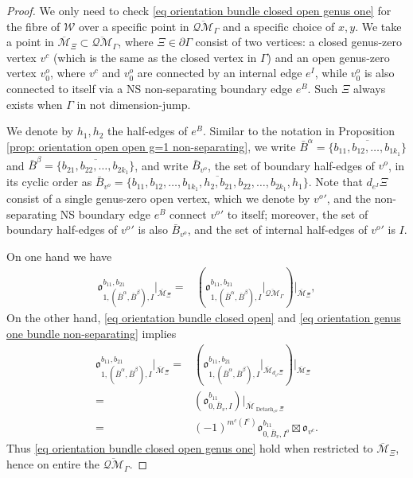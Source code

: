 \documentclass[11pt,a4paper]{article}
\theoremstyle{definition}
\theoremstyle{remark}
\newcommand{\oQMb}{{\overline{\mathcal{QM}}}}
\numberwithin{equation}{section}
\def\Mbar{{\overline{\mathcal M}}}
\begin{document}
\begin{proof}
    We only need to check \eqref{eq orientation bundle closed open genus one} for the fibre of $\mathcal W$ over a specific point in $\oQMb_\Gamma$ and a specific choice of $x,y$. We take a point in     $\Mbar_{\Xi}\subset \oQMb_{\Gamma}$,     where $\Xi\in \partial \Gamma$ consist of two vertices: a closed genus-zero vertex $v^c$ (which is the same as the closed vertex in $\Gamma$) and an open genus-zero vertex $v^o_0$, where $v^c$ and $v^o_0$ are connected by an internal edge $e^I$, while $v^o_0$ is also connected to itself via a NS non-separating  boundary edge $e^B$. Such $\Xi$ always exists when $\Gamma$ in not dimension-jump.

    We denote by $h_1,h_2$ the half-edges of $e^B$. Similar to the notation in Proposition \ref{prop: orientation open open g=1 non-separating}, we write $\bar{B}^\alpha=\overline{\{b_{11},b_{12},\dots,b_{1k_1}\}}$ and $\bar{B}^\beta=\overline{\{b_{21},b_{22},\dots,b_{2k_1}\}}$, and write $\bar{B}_{v^o}$, the set of boundary half-edges of $v^o$, in its cyclic order as $\bar{B}_{v^o}=\overline{\{b_{11},b_{12},\dots,b_{1k_1},h_2,b_{21},b_{22},\dots,b_{2k_1},h_1\}}$. Note that $d_{e^I}\Xi$ consist of a single genus-zero open vertex, which we denote by ${v^o}'$, and the non-separating NS boundary edge $e^B$ connect ${v^o}'$ to itself; moreover, the set of boundary half-edges of ${v^o}'$ is also $\bar{B}_{v^o}$, and the set of internal half-edges of ${v^o}'$ is $I$.
    

    
    On one hand we have
    \begin{equation*}
    \begin{split}
        {\mathfrak{o}}^{b_{11},b_{21}}_{1,(\bar{B}^\alpha,\bar{B}^\beta),I}|_{\Mbar_\Xi} =&\left({\mathfrak{o}}^{b_{11},b_{21}}_{1,(\bar{B}^\alpha,\bar{B}^\beta),I}|_{\oQMb_\Gamma}\right)\big\vert_{\Mbar_{\Xi}},
    \end{split}
    \end{equation*}
   On the other hand, \eqref{eq orientation bundle closed open} and \eqref{eq orientation genus one bundle non-separating} implies 
    \begin{equation*}
    \begin{split}
        {\mathfrak{o}}^{b_{11},b_{21}}_{1,(\bar{B}^\alpha,\bar{B}^\beta),I}|_{\Mbar_\Xi} =&\left({\mathfrak{o}}^{b_{11},b_{21}}_{1,(\bar{B}^\alpha,\bar{B}^\beta),I}|_{\Mbar_{d_{e^I}\Xi}}\right)\big\vert_{\Mbar_{\Xi}}\\
        =&  \left( {\mathfrak{o}}^{b_{11}}_{0,\bar B_v,I} \right)\big \vert_{\Mbar_{\operatorname{Detach}_{e^B} \Xi}}
        \\=&(-1)^{m^c(I^c)}{\mathfrak{o}}^{b_{11}}_{0,\bar{B}_v,I^o}\boxtimes {\mathfrak{o}}_{v^c}.
    \end{split}
    \end{equation*}
    Thus  \eqref{eq orientation bundle closed open genus one} hold when restricted to $\Mbar_\Xi$, hence on entire the $\oQMb_\Gamma$.

\end{proof}
\end{document}
